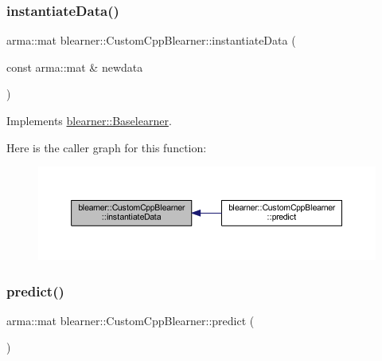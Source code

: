 \subsubsection{\texorpdfstring{instantiate\+Data()}{instantiateData()}}
{\footnotesize\ttfamily arma\+::mat blearner\+::\+Custom\+Cpp\+Blearner\+::instantiate\+Data (\begin{DoxyParamCaption}\item[{const arma\+::mat \&}]{newdata }\end{DoxyParamCaption})\hspace{0.3cm}{\ttfamily [virtual]}}



Implements \mbox{\hyperlink{classblearner_1_1_baselearner_af01f1b8c4540927705ff79c3649489f7}{blearner\+::\+Baselearner}}.

Here is the caller graph for this function\+:\nopagebreak
\begin{figure}[H]
\begin{center}
\leavevmode
\includegraphics[width=350pt]{classblearner_1_1_custom_cpp_blearner_a14607a1d1f312d46a3024b37085c146d_icgraph}
\end{center}
\end{figure}
\mbox{\label{classblearner_1_1_custom_cpp_blearner_aa17db5f5627b8251b2d8484d92e783b9}} 
\subsubsection{\texorpdfstring{predict()}{predict()}\hspace{0.1cm}{\footnotesize\ttfamily [1/2]}}
{\footnotesize\ttfamily arma\+::mat blearner\+::\+Custom\+Cpp\+Blearner\+::predict (\begin{DoxyParamCaption}{ }\end{DoxyParamCaption})\hspace{0.3cm}{\ttfamily [virtual]}}



